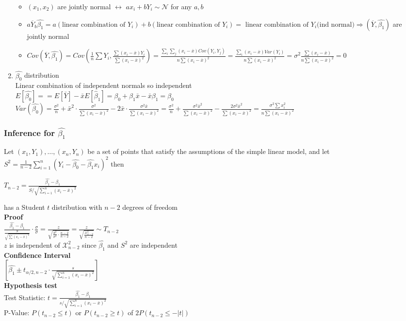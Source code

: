 \documentclass{article}
\begin{document}
\begin{enumerate}
\begin{itemize}
        \item $(x_1,x_2)$ are jointly normal $\leftrightarrow$ $ax_i+bY_i\sim\mathcal{N}$ for any $a,b$
        \item $a\overline{Y}_b\hat{\beta_1}=a(\text{linear combination of }Y_i)+b(\text{linear combination of }Y_i)=\text{ linear combination of }Y_i\text{(ind normal)}\Rightarrow (\overline{Y},\hat{\beta_1})$ are jointly normal
        \item $Cov(\overline{Y},\hat{\beta_1})=Cov(\frac{1}{n}\sum Y_i,\frac{\sum(x_i-\overline{x})Y_i}{\sum(x_i-\overline{x})^2})=\frac{\sum_i\sum_j(x_i-\overline{x})Cov(Y_i,Y_j)}{n\sum(x_i-\overline{x})^2}=\frac{\sum_i(x_i-\overline{x})Var(Y_i)}{n\sum(x_i-\overline{x})^2}=\sigma^2\frac{\sum(x_i-\overline{x})}{n\sum(x_i-\overline{x})^2}=0$
    \end{itemize}
    \item $\hat{\beta_0}$ distribution\\
    Linear combination of independent normals so independent\\
    $E[\hat{\beta_0}]== E[\bar{Y}] - \bar{x} E[\hat{\beta}_1] = \beta_0 + \beta_1 \bar{x} - \bar{x} \beta_1 = \beta_0$\\
    $Var(\hat{\beta_0})=\frac{\sigma^2}{n} + \bar{x}^2 \cdot \frac{\sigma^2}{\sum (x_i - \bar{x})^2}
- 2 \bar{x} \cdot \frac{\sigma^2 \bar{x}}{\sum (x_i - \bar{x})^2}=\frac{\sigma^2}{n} + \frac{\sigma^2 \bar{x}^2}{\sum (x_i - \bar{x})^2}
- \frac{2 \sigma^2 \bar{x}^2}{\sum (x_i - \bar{x})^2}
= \frac{\sigma^2\sum x_i^2}{n\sum(x_i-\overline{x})^2}$
\end{enumerate}
\subsubsection{Inference for $\hat{\beta_1}$}
Let $(x_1,Y_1),\dots,(x_n,Y_n)$ be a set of points that satisfy the assumptions of the simple linear model, and let $S^2=\frac{1}{n-2}\sum_{i=1}^n(Y_i-\hat{\beta_0}-\hat{\beta_1}x_i)^2$ then
\begin{center}
    $T_{n-2}=\frac{\hat{\beta_1}-\beta_1}{S/\sqrt{\sum_{i=1}^n(x_i-\overline{x})^2}}$
\end{center}
has a Student $t$ distribution with $n-2$ degrees of freedom\\
\textbf{Proof}\\
$\frac{\hat{\beta_1}-\beta_1}{\frac{S}{\sqrt{\sum(x_i-\overline{x})^2}}}\cdot\frac{\sigma}{\sigma}=\frac{z}{\sqrt{\frac{S^2}{\sigma^2}\cdot\frac{n-2}{n-2}}}=\frac{z}{\sqrt{\frac{\mathcal{X}^2_{n-2}}{n-2}}}\sim T_{n-2}$\\
$z$ is independent of $\mathcal{X}^2_{n-2}$ since $\hat{\beta_1}$ and $S^2$ are independent\\
\textbf{Confidence Interval}\\
$[\hat{\beta_1}\pm t_{\alpha/2,n-2}\cdot\frac{s}{\sqrt{\sum_{i=1}^n(x_i-\overline{x})^2}}]$\\
\textbf{Hypothesis test}\\
Test Statistic: $t=\frac{\hat{\beta_1}-\beta_1}{s/\sqrt{\sum_{i=1}^n(x_i-\overline{x})^2}}$\\
P-Value: $P(t_{n-2}\leq t)$ or $P(t_{n-2}\geq t)$ of $2P(t_{n-2}\leq-\vert t\vert)$
\end{document}
